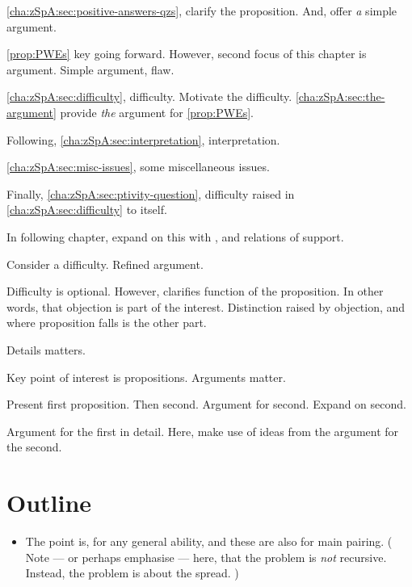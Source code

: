 \begin{note}
  \autoref{cha:zSpA:sec:positive-answers-qzs}, clarify the proposition.
  And, offer \emph{a} simple argument.

  \autoref{prop:PWEs} key going forward.
  However, second focus of this chapter is argument.
  Simple argument, flaw.

  \autoref{cha:zSpA:sec:difficulty}, difficulty.
  Motivate the difficulty.
  \autoref{cha:zSpA:sec:the-argument} provide \emph{the} argument for \autoref{prop:PWEs}.

  Following, \autoref{cha:zSpA:sec:interpretation}, interpretation.

  \autoref{cha:zSpA:sec:misc-issues}, some miscellaneous issues.

  Finally, \autoref{cha:zSpA:sec:ptivity-question}, difficulty raised in \autoref{cha:zSpA:sec:difficulty} to \qzS{} itself.
\end{note}

\begin{note}
  In following chapter, expand on this with , and relations of support.
\end{note}

\begin{note}
  Consider a difficulty.
  Refined argument.

  Difficulty is optional.
  However, clarifies function of the proposition.
  In other words, that objection is part of the interest.
  Distinction raised by objection, and where proposition falls is the other part.
\end{note}

\begin{note}
  Details matters.

  Key point of interest is propositions.
  Arguments matter.

  Present first proposition.
  Then second.
  Argument for second.
  Expand on second.

  Argument for the first in detail.
  Here, make use of ideas from the argument for the second.
\end{note}

\section{Outline}
\label{cha:zSpA:sec:outline}

\begin{note}
  \begin{itemize}
  \item
    The point is,  for any general ability, and these are also  for main pairing.
    (%
    Note --- or perhaps emphasise --- here, that the problem is \emph{not} recursive.
    Instead, the problem is about the spread.%
    )
  \end{itemize}
\end{note}


